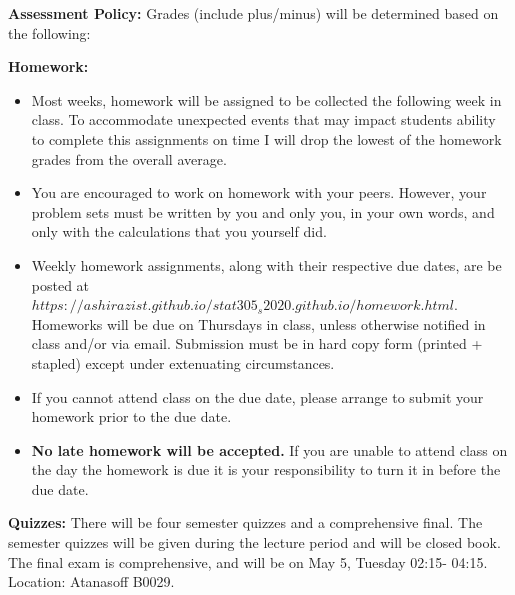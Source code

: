 \documentclass[12pt]{article}\usepackage[]{graphicx}\usepackage[]{color}
\begin{document}
\noindent\textbf{Assessment Policy:} Grades (include plus/minus) will be determined based on the following:
\begin{center} 
	\begin{minipage}{6.5in}
		\begin{flushleft}
			\textbf{Homework:} 
			\begin{itemize}
				\item 	Most weeks, homework will be assigned to be collected the following week in class. To accommodate unexpected events that may impact students ability to complete this assignments on time I will drop the lowest of the homework grades from the overall average.
				\item 	You are encouraged to work on homework with your peers. However, your problem sets must be written by you and only you, in your own words, and only with the calculations that you yourself did.
				\item Weekly homework assignments, along with their respective due dates, are be posted at \href{https://ashirazist.github.io/stat305_s2020.github.io/homework.html}{$https://ashirazist.github.io/stat305_s2020.github.io/homework.html$}. Homeworks will be due on Thursdays in class, unless otherwise notified in class and/or via email. Submission must be in hard copy form (printed + stapled) except under extenuating circumstances.
				\item  If you cannot attend class on the due date, please arrange to submit your homework prior to the due date.
				\item \textbf{No late homework will be accepted.} If you are unable to attend class on the day the homework is due it is your responsibility to turn it in before the due date.
		\end{itemize}
		\end{flushleft}
	\end{minipage}
\end{center}

\begin{center} 
	\begin{minipage}{6.5in}
		\begin{flushleft}
			\textbf{Quizzes:} 
			There will be four semester quizzes and a comprehensive final. The semester quizzes will be given during the lecture period and will be closed book. The final exam is comprehensive, and will be on May 5, Tuesday 02:15- 04:15. Location:  Atanasoff B0029.
		\end{flushleft}
	\end{minipage}
\end{center}
\end{document}
